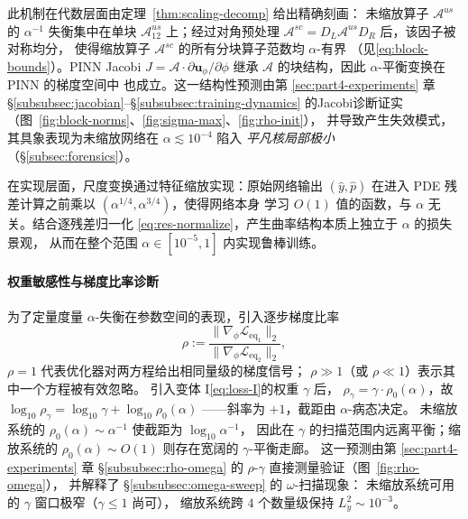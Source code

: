 \documentclass{xmu}
\theoremstyle{plain}
\theoremstyle{remark}
\begin{document}
此机制在代数层面由定理~\ref{thm:scaling-decomp} 给出精确刻画：
未缩放算子 $\mathcal{A}^{us}$ 的 $\alpha^{-1}$ 失衡集中在单块
$\mathcal{A}^{us}_{12}$ 上；经过对角预处理
$\mathcal{A}^{sc}=D_L\mathcal{A}^{us}D_R$ 后，该因子被对称均分，
使得缩放算子 $\mathcal{A}^{sc}$ 的所有分块算子范数均 $\alpha$-有界
（见\eqref{eq:block-bounds}）。PINN Jacobi $J=\mathcal A\cdot\partial\mathbf u_\phi/\partial\phi$
继承 $\mathcal A$ 的块结构，因此 $\alpha$-平衡变换在 PINN 的梯度空间中
也成立。这一结构性预测由第 \ref{sec:part4-experiments} 章
§\ref{subsubsec:jacobian}--§\ref{subsubsec:training-dynamics} 的Jacobi诊断证实
（图~\ref{fig:block-norms}、\ref{fig:sigma-max}、\ref{fig:rho-init}），
并导致产生失效模式，其具象表现为未缩放网络在 $\alpha\lesssim 10^{-4}$ 陷入
\emph{平凡核局部极小}（§\ref{subsec:forensics}）。

在实现层面，尺度变换通过特征缩放实现：原始网络输出 $(\hat y,\hat p)$
在进入 PDE 残差计算之前乘以 $(\alpha^{1/4},\alpha^{3/4})$，使得网络本身
学习 $O(1)$ 值的函数，与 $\alpha$ 无关。结合逐残差归一化
\eqref{eq:res-normalize}，产生曲率结构本质上独立于 $\alpha$ 的损失景观，
从而在整个范围 $\alpha\in[10^{-5},1]$ 内实现鲁棒训练。

\paragraph{权重敏感性与梯度比率诊断}
为了定量度量 $\alpha$-失衡在参数空间的表现，引入逐步梯度比率
\begin{equation}
\rho := \frac{\|\nabla_\phi\mathcal{L}_{\mathrm{eq}_1}\|_2}
             {\|\nabla_\phi\mathcal{L}_{\mathrm{eq}_2}\|_2},
\label{eq:rho-def}
\end{equation}
$\rho=1$ 代表优化器对两方程给出相同量级的梯度信号；
$\rho\gg 1$（或 $\rho\ll 1$）表示其中一个方程被有效忽略。
引入变体 I\eqref{eq:loss-I}的权重 $\gamma$ 后，
$\rho_\gamma=\gamma\cdot\rho_0(\alpha)$，故
$\log_{10}\rho_\gamma=\log_{10}\gamma+\log_{10}\rho_0(\alpha)$
——斜率为 $+1$，截距由 $\alpha$-病态决定。
未缩放系统的 $\rho_0(\alpha)\sim\alpha^{-1}$ 使截距为 $\log_{10}\alpha^{-1}$，
因此在 $\gamma$ 的扫描范围内远离平衡；缩放系统的
$\rho_0(\alpha)\sim O(1)$ 则存在宽阔的 $\gamma$-平衡走廊。
这一预测由第 \ref{sec:part4-experiments} 章 §\ref{subsubsec:rho-omega}
的 $\rho$-$\gamma$ 直接测量验证（图~\ref{fig:rho-omega}），
并解释了 §\ref{subsubsec:omega-sweep} 的 $\omega$-扫描现象：
未缩放系统可用的 $\gamma$ 窗口极窄（$\gamma\le 1$ 尚可），
缩放系统跨 $4$ 个数量级保持 $L^2_y\sim 10^{-3}$。
\end{document}
